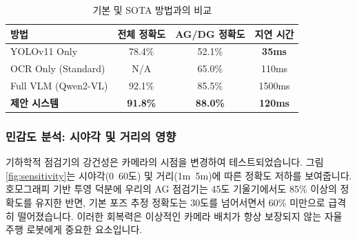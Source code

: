 \begin{table}[h]
\caption{기본 및 SOTA 방법과의 비교}
\label{tab:comparison}
\centering
\begin{tabular}{|l|c|c|c|}
\hline
\textbf{방법} & \textbf{전체 정확도} & \textbf{AG/DG 정확도} & \textbf{지연 시간} \\
\hline
YOLOv11 Only & 78.4\% & 52.1\% & \textbf{35ms} \\
OCR Only (Standard) & N/A & 65.0\% & 110ms \\
Full VLM (Qwen2-VL) & 92.1\% & 85.5\% & 1500ms \\
\textbf{제안 시스템} & \textbf{91.8\%} & \textbf{88.0\%} & \textbf{120ms} \\
\hline
\end{tabular}
\end{table}

\subsubsection{민감도 분석: 시야각 및 거리의 영향}
기하학적 점검기의 강건성은 카메라의 시점을 변경하여 테스트되었습니다.
그림 \ref{fig:sensitivity}는 시야각(0~60도) 및 거리(1m~5m)에 따른 정확도 저하를 보여줍니다.
호모그래피 기반 투영 덕분에 우리의 AG 점검기는 45도 기울기에서도 85\% 이상의 정확도를 유지한 반면, 기본 포즈 추정 정확도는 30도를 넘어서면서 60\% 미만으로 급격히 떨어졌습니다.
이러한 회복력은 이상적인 카메라 배치가 항상 보장되지 않는 자율 주행 로봇에게 중요한 요소입니다.

